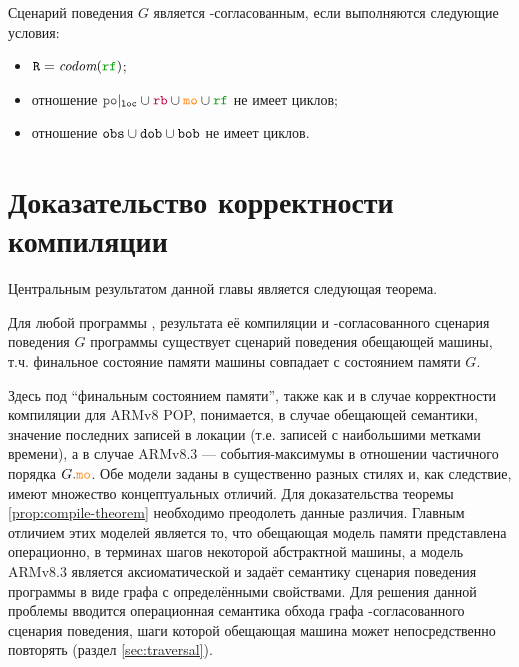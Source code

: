 \begin{definition}
Сценарий поведения $G$ является \ARM-согласованным, если выполняются следующие условия:
\begin{itemize}
\item $\lR = \codom{\lRF}$; 
\item отношение $\lPO\rst{\lLOC} \cup \lFR \cup \lCO \cup \lRF$ не имеет циклов; 
\item отношение ${\mathtt{obs}} \cup {\mathtt{dob}} \cup {\mathtt{bob}}$ не имеет циклов. 
\end{itemize}
\end{definition}
\section{Доказательство корректности компиляции}
\label{sec:highlevel}
\noindent
Центральным результатом данной главы является следующая теорема. 
\begin{theorem}
  \label{prop:compile-theorem}
  Для любой программы \Prog, результата её компиляции \ProgARM и \ARM-согласованного
  сценария поведения $G$ программы
  \ProgARM существует сценарий поведения обещающей машины, т.ч. 
  финальное состояние памяти машины совпадает с состоянием памяти $G$.
\end{theorem}
\noindent
Здесь под ``финальным состоянием памяти'', также как и в случае корректности компиляции для
ARMv8 POP, понимается, в случае обещающей семантики, значение последних записей в локации (т.е. записей с наибольшими
метками времени), а в случае ARMv8.3 --- события-максимумы в отношении частичного порядка $G.\lCO$. Обе модели заданы в существенно разных стилях и, как следствие, имеют множество концептуальных отличий. Для доказательства теоремы \ref{prop:compile-theorem} необходимо преодолеть данные различия.
Главным отличием этих моделей является то, что обещающая модель памяти представлена операционно, в терминах
шагов некоторой абстрактной машины, а модель ARMv8.3 является аксиоматической и задаёт семантику 
сценария поведения программы в виде графа с определёнными свойствами. 
Для решения данной проблемы вводится операционная семантика обхода графа \ARM-согласованного
сценария поведения,
шаги которой обещающая машина может непосредственно повторять (раздел \ref{sec:traversal}).
